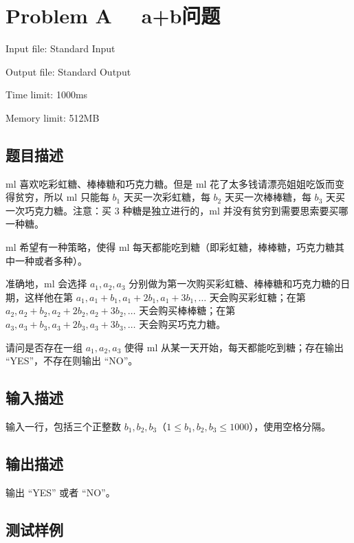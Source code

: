 \newpage
\section{Problem A \ \ a+b问题}
{ \limitfont{}
Input file: Standard Input \par
Output file: Standard Output \par
Time limit: 1000ms \par
Memory limit: 512MB \par
}

\subsection*{题目描述}

ml 喜欢吃彩虹糖、棒棒糖和巧克力糖。但是 ml 花了太多钱请漂亮姐姐吃饭而变得贫穷，所以 ml 只能每 $b_1$ 天买一次彩虹糖，每 $b_2$ 天买一次棒棒糖，每 $b_3$ 天买一次巧克力糖。注意：买 $3$ 种糖是独立进行的，ml 并没有贫穷到需要思索要买哪一种糖。

ml 希望有一种策略，使得 ml 每天都能吃到糖（即彩虹糖，棒棒糖，巧克力糖其中一种或者多种）。

准确地，ml 会选择 $a_1,a_2,a_3$ 分别做为第一次购买彩虹糖、棒棒糖和巧克力糖的日期，这样他在第 $a_1,a_1+b_1,a_1+2b_1,a_1+3b_1,\dots$ 天会购买彩虹糖；在第 $a_2,a_2+b_2,a_2+2b_2,a_2+3b_2,\dots$ 天会购买棒棒糖；在第 $a_3,a_3+b_3,a_3+2b_3,a_3+3b_3,\dots$ 天会购买巧克力糖。

请问是否存在一组 $a_1,a_2,a_3$ 使得 ml 从某一天开始，每天都能吃到糖；存在输出 ``YES''，不存在则输出 ``NO''。

\subsection*{输入描述}

输入一行，包括三个正整数 $b_1,b_2,b_3$（$1\leq b_1,b_2,b_3\leq 1000$），使用空格分隔。

\subsection*{输出描述}

输出 ``YES'' 或者 ``NO''。

\subsection*{测试样例}

